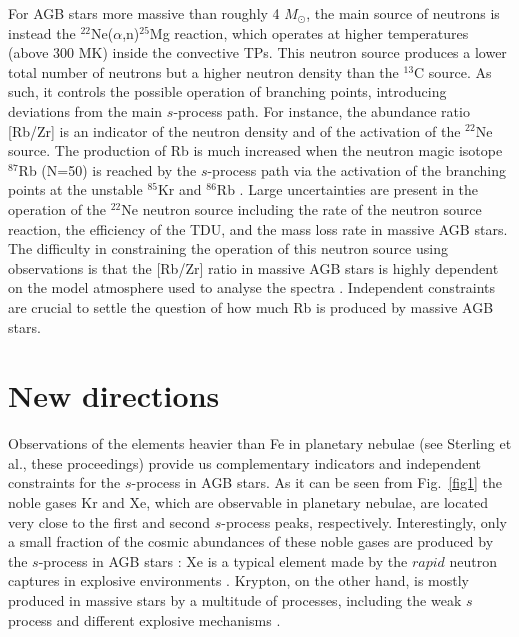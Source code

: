 \documentclass{iau}
\newcommand{\msun}{\ensuremath{{M}_{\odot}}}
\begin{document}
For AGB stars more massive than roughly 4 \msun, the main source of neutrons is 
instead the $^{22}$Ne($\alpha$,n)$^{25}$Mg reaction, which operates at higher 
temperatures (above 300 MK) inside the convective TPs. This neutron source produces a 
lower total number of neutrons but a higher neutron density than the $^{13}$C source. 
As such, it controls the possible operation of branching points, introducing deviations from 
the main $s$-process path. For instance, the abundance ratio [Rb/Zr] is an 
indicator of the neutron density and of the activation of the $^{22}$Ne source. 
The production of Rb 
is much increased when the neutron magic isotope $^{87}$Rb (N=50) is reached by the 
$s$-process path via the activation of the branching 
points at the unstable $^{85}$Kr and $^{86}$Rb \citep{abia01,vanraai12}. Large 
uncertainties are present in the operation of the $^{22}$Ne 
neutron source 
including the rate of the neutron source reaction, the efficiency of the 
TDU, and the mass loss rate in massive AGB stars.
The difficulty in constraining the operation of this neutron source using
observations is that the [Rb/Zr] ratio in massive AGB stars is highly dependent on 
the model atmosphere used to analyse the spectra \citep{zamora14}. Independent 
constraints are crucial to settle the question of how much Rb is 
produced by massive AGB stars.

\section{New directions}

Observations of the elements heavier than Fe in planetary nebulae (see Sterling et al., 
these proceedings) provide us complementary indicators and independent constraints for 
the $s$-process in AGB stars. As it can be seen from Fig.~\ref{fig1} the noble gases 
Kr and Xe, which are observable in planetary nebulae, are located very close to the 
first and second $s$-process peaks, respectively. Interestingly, only a small fraction of the 
cosmic abundances of these noble gases are produced by the $s$-process in AGB stars
\citep{arlandini99,bisterzo14}: Xe is a 
typical element made by the $rapid$ neutron captures in explosive environments 
\citep{thielemann11}. Krypton, on the other hand, is 
mostly produced %
in massive stars by a multitude of processes, including the weak $s$ process 
and different explosive mechanisms \citep[e.g.,][and references therein]{roberts10,pignatari16}.
\end{document}
